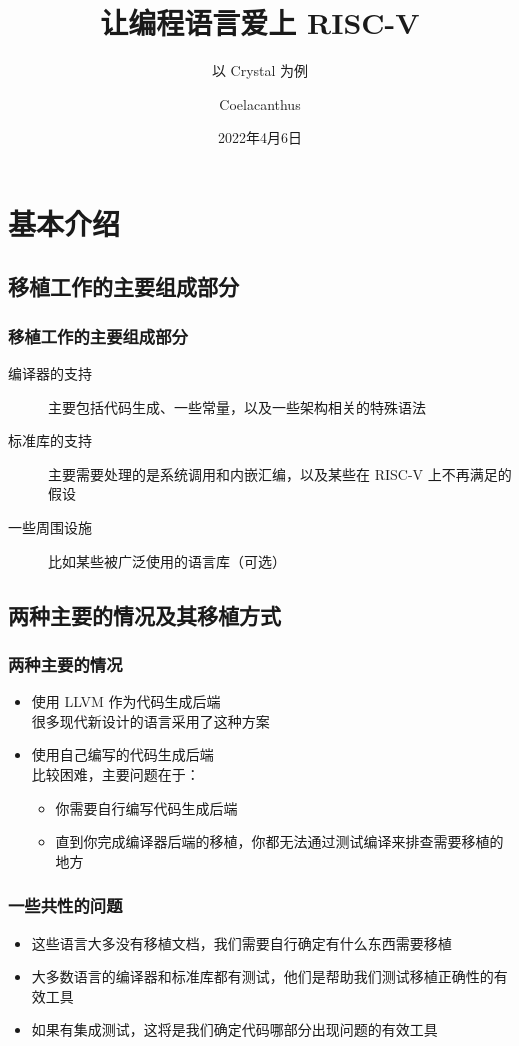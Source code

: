 \documentclass[UTF-8]{ctexbeamer}
\title{让编程语言爱上 RISC-V}
\subtitle{以 Crystal 为例}
\author{Coelacanthus}
\institute{PLCT Arch RISC-V 小队}
\date{2022年4月6日}
\begin{document}
\frame{\titlepage}

\section{基本介绍}
\subsection{移植工作的主要组成部分}
\begin{frame}
	\frametitle{移植工作的主要组成部分}

	\begin{description}
		\item[编译器的支持] 主要包括代码生成、一些常量，以及一些架构相关的特殊语法
		\pause
		\item[标准库的支持] 主要需要处理的是系统调用和内嵌汇编，以及某些在 RISC-V 上不再满足的假设
		\pause
		\item[一些周围设施] 比如某些被广泛使用的语言库（可选）
	\end{description}

\end{frame}

\subsection{两种主要的情况及其移植方式}
\begin{frame}
	\frametitle{两种主要的情况}

	\begin{itemize}
		\item 使用 LLVM 作为代码生成后端 \\
			很多现代新设计的语言采用了这种方案
		\item 使用自己编写的代码生成后端 \\
			\pause
			比较困难，主要问题在于：
			\begin{itemize}
				\item 你需要自行编写代码生成后端
				\item 直到你完成编译器后端的移植，你都无法通过测试编译来排查需要移植的地方
			\end{itemize}
	\end{itemize}

\end{frame}

\begin{frame}
	\frametitle{一些共性的问题}

	\begin{itemize}
		\item 这些语言大多没有移植文档，我们需要自行确定有什么东西需要移植
		\item 大多数语言的编译器和标准库都有测试，他们是帮助我们测试移植正确性的有效工具
		\item 如果有集成测试，这将是我们确定代码哪部分出现问题的有效工具
	\end{itemize}

\end{frame}
\end{document}
